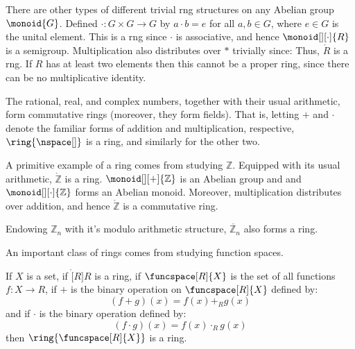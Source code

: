     \begin{example}
        There are other types of different trivial rng structures on any
        Abelian group $\monoid{G}$. Defined $\cdot:G\times{G}\rightarrow{G}$
        by $a\cdot{b}=e$ for all $a,b\in{G}$, where $e\in{G}$ is the unital
        element. This is a rng since $\cdot$ is associative, and hence
        $\monoid[][\cdot]{R}$ is a semigroup. Multiplication also
        distributes over $*$ trivially since:
        \vspace{-2.5ex}
        Thus, $\ring{R}$ is a rng. If $R$ has at least two elements then
        this cannot be a proper ring, since there can be no multiplicative
        identity.
    \end{example}
    \begin{example}
        The rational, real, and complex numbers, together with their usual
        arithmetic, form commutative rings (moreover, they form fields).
        That is, letting $+$ and $\cdot$ denote the familiar forms of
        addition and multiplication, respective, $\ring{\nspace[]}$ is a
        ring, and similarly for the other two.
    \end{example}
    \begin{example}
        A primitive example of a ring comes from studying $\mathbb{Z}$.
        Equipped with its usual arithmetic, $\ring{\mathbb{Z}}$ is a ring.
        $\monoid[][+]{\mathbb{Z}}$ is an Abelian group and and
        $\monoid[][\cdot]{\mathbb{Z}}$ forms an Abelian monoid. Moreover,
        multiplication distributes over addition, and hence
        $\ring{\mathbb{Z}}$ is a commutative ring.
    \end{example}
    \begin{example}
        Endowing $\mathbb{Z}_{n}$ with it's modulo arithmetic structure,
        $\ring{\mathbb{Z}_{n}}$ also forms a ring.
    \end{example}
    An important class of rings comes from studying function spaces.
    \begin{theorem}
        \label{thm:Ring_of_Funcs_is_Ring}%
        If $X$ is a set, if $\ring[R]{R}$ is a ring, if
        $\funcspace[R]{X}$ is the set of all functions $f:X\rightarrow{R}$,
        if $+$ is the binary operation on $\funcspace[R]{X}$ defined by:
        \begin{equation}
            (f+g)(x)=f(x)+_{R}g(x)
        \end{equation}
        and if $\cdot$ is the binary operation defined by:
        \begin{equation}
            (f\cdot{g})(x)=f(x)\cdot_{R}g(x)
        \end{equation}
        then $\ring{\funcspace[R]{X}}$ is a ring.
    \end{theorem}
